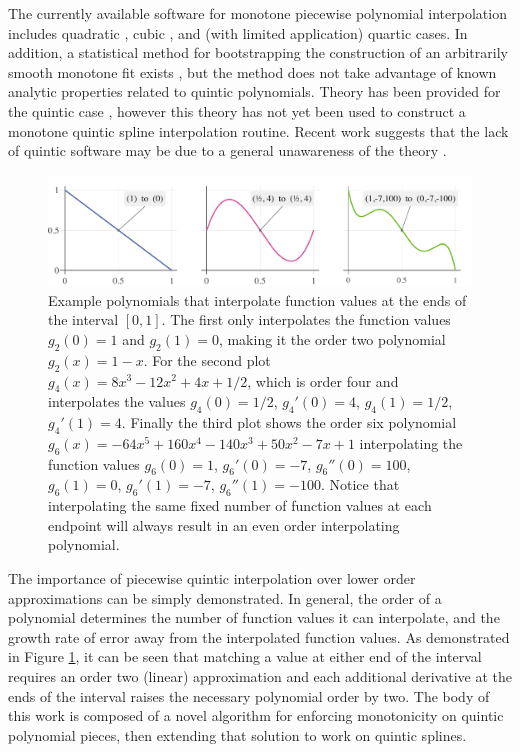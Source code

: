 \documentclass{scspaperproc}
\theoremstyle{scsthe}
\begin{document}
The currently available software for monotone piecewise polynomial interpolation includes quadratic \cite{he1998monotone}, cubic \cite{fritsch1980monotone}, and (with limited application) quartic \cite{wang2004rational,piah2011improved,yao2018unconditionally} cases. In addition, a statistical method for bootstrapping the construction of an arbitrarily smooth monotone fit exists \cite{leitenstorfer2006generalized}, but the method does not take advantage of known analytic properties related to quintic polynomials. Theory has been provided for the quintic case \cite{ulrich1994positivity,hess1994positive}, however this theory has not yet been used to construct a monotone quintic spline interpolation routine. Recent work suggests that the lack of quintic software may be due to a general unawareness of the theory .

\begin{figure}
  \centering
  \includegraphics[width=.9\textwidth]{spline_demonstration}
  \caption{Example polynomials that interpolate function values at the ends of the interval $[0,1]$. The first only interpolates the function values $g_2(0) = 1$ and $g_2(1) = 0$, making it the order two polynomial $g_2(x) = 1 - x$. For the second plot $g_4(x) = 8x^3 - 12x^2 + 4x + 1/2$, which is order four and interpolates the values $g_4(0) = 1/2$, $g_4'(0) = 4$, $g_4(1) = 1/2$, $g_4'(1) = 4$. Finally the third plot shows the order six polynomial $g_6(x) = - 64x^5 + 160x^4 - 140x^3 + 50x^2 - 7x + 1$ interpolating the function values $g_6(0) = 1$, $g_6'(0) = -7$, $g_6''(0) = 100$, $g_6(1) = 0$, $g_6'(1) = -7$, $g_6''(1) = -100$. Notice that interpolating the same fixed number of function values at each endpoint will always result in an even order interpolating polynomial.
  }\label{fig:spline_demonstration}
\end{figure}

The importance of piecewise quintic interpolation over lower order approximations can be simply demonstrated. In general, the order of a polynomial determines the number of function values it can interpolate, and the growth rate of error away from the interpolated function values. As demonstrated in Figure \ref{fig:spline_demonstration}, it can be seen that matching a value at either end of the interval requires an order two (linear) approximation and each additional derivative at the ends of the interval raises the necessary polynomial order by two. The body of this work is composed of a novel algorithm for enforcing monotonicity on quintic polynomial pieces, then extending that solution to work on quintic splines.
\end{document}
